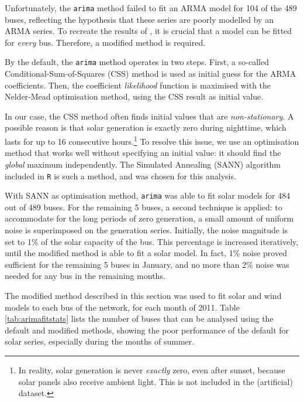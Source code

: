 \documentclass[main.tex]{subfiles}
\begin{document}
Unfortunately, the \texttt{arima} method failed to fit an ARMA model for 104 of the 489 buses, reflecting the hypothesis that these series are poorly modelled by an ARMA series. To recreate the results of \cite{Nesti2018emergentfailures}, it is crucial that a model can be fitted for \emph{every} bus. Therefore, a modified method is required.

By the default, the \texttt{arima} method operates in two steps. First, a so-called Conditional-Sum-of-Squares (CSS) method is used as initial guess for the ARMA coefficients. Then, the coefficient \emph{likelihood} function is maximised with the Nelder-Mead optimisation method, using the CSS result as initial value.

In our case, the CSS method often finds initial values that are \emph{non-stationary}. A possible reason is that solar generation is exactly zero during nighttime, which lasts for up to 16 consecutive hours.\footnote{In reality, solar generation is never \emph{exactly} zero, even after sunset, because solar panels also receive ambient light. This is not included in the (artificial) dataset.
}
To resolve this issue, we use an optimisation method that works well without specifying an initial value: it should find the \emph{global} maximum independently. The Simulated Annealing (SANN) algorithm included in \texttt{R} is such a method, and was chosen for this analysis.

With SANN as optimisation method, \texttt{arima} was able to fit solar models for 484 out of 489 buses. For the remaining 5 buses, a second technique is applied: to accommodate for the long periods of zero generation, a small amount of uniform noise is superimposed on the generation series. Initially, the noise magnitude is set to 1\% of the solar capacity of the bus. This percentage is increased iteratively, until the modified method is able to fit a solar model. In fact, 1\% noise proved sufficient for the remaining 5 buses in January, and no more than 2\% noise was needed for any bus in the remaining months.

The modified method described in this section was used to fit solar and wind models to each bus of the network, for each month of 2011. Table \ref{tab:arimafitstats} lists the number of buses that can be analysed using the default and modified methods, showing the poor performance of the default for solar series, especially during the months of summer.
\end{document}
